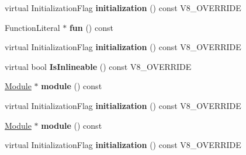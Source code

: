 \begin{DoxyCompactItemize}
\item 
\hypertarget{classv8_1_1internal_1_1_v8___f_i_n_a_l_afbb087b357518cacddd56af73b937289}{}virtual Initialization\+Flag {\bfseries initialization} () const V8\+\_\+\+O\+V\+E\+R\+R\+I\+D\+E\label{classv8_1_1internal_1_1_v8___f_i_n_a_l_afbb087b357518cacddd56af73b937289}

\item 
\hypertarget{classv8_1_1internal_1_1_v8___f_i_n_a_l_ad18dac32b2df144c2b5f068e2470cd97}{}Function\+Literal $\ast$ {\bfseries fun} () const \label{classv8_1_1internal_1_1_v8___f_i_n_a_l_ad18dac32b2df144c2b5f068e2470cd97}

\item 
\hypertarget{classv8_1_1internal_1_1_v8___f_i_n_a_l_afbb087b357518cacddd56af73b937289}{}virtual Initialization\+Flag {\bfseries initialization} () const V8\+\_\+\+O\+V\+E\+R\+R\+I\+D\+E\label{classv8_1_1internal_1_1_v8___f_i_n_a_l_afbb087b357518cacddd56af73b937289}

\item 
\hypertarget{classv8_1_1internal_1_1_v8___f_i_n_a_l_a3b5be7fa36f98f39edc4120c9dc17612}{}virtual bool {\bfseries Is\+Inlineable} () const V8\+\_\+\+O\+V\+E\+R\+R\+I\+D\+E\label{classv8_1_1internal_1_1_v8___f_i_n_a_l_a3b5be7fa36f98f39edc4120c9dc17612}

\item 
\hypertarget{classv8_1_1internal_1_1_v8___f_i_n_a_l_a203b6ba6c5d0e204c935803f872f4f49}{}\hyperlink{classv8_1_1internal_1_1_module}{Module} $\ast$ {\bfseries module} () const \label{classv8_1_1internal_1_1_v8___f_i_n_a_l_a203b6ba6c5d0e204c935803f872f4f49}

\item 
\hypertarget{classv8_1_1internal_1_1_v8___f_i_n_a_l_afbb087b357518cacddd56af73b937289}{}virtual Initialization\+Flag {\bfseries initialization} () const V8\+\_\+\+O\+V\+E\+R\+R\+I\+D\+E\label{classv8_1_1internal_1_1_v8___f_i_n_a_l_afbb087b357518cacddd56af73b937289}

\item 
\hypertarget{classv8_1_1internal_1_1_v8___f_i_n_a_l_a203b6ba6c5d0e204c935803f872f4f49}{}\hyperlink{classv8_1_1internal_1_1_module}{Module} $\ast$ {\bfseries module} () const \label{classv8_1_1internal_1_1_v8___f_i_n_a_l_a203b6ba6c5d0e204c935803f872f4f49}

\item 
\hypertarget{classv8_1_1internal_1_1_v8___f_i_n_a_l_afbb087b357518cacddd56af73b937289}{}virtual Initialization\+Flag {\bfseries initialization} () const V8\+\_\+\+O\+V\+E\+R\+R\+I\+D\+E\label{classv8_1_1internal_1_1_v8___f_i_n_a_l_afbb087b357518cacddd56af73b937289}


\end{DoxyCompactItemize}
